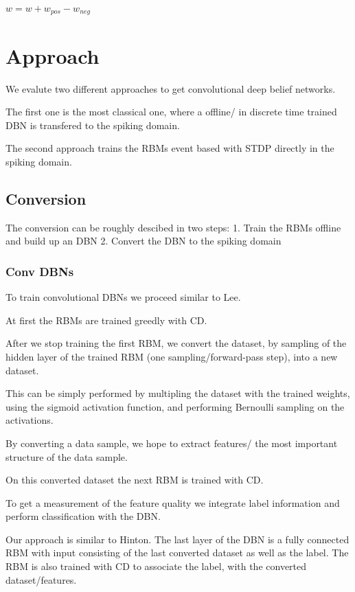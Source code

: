 $w = w + w_{pos} - w_{neg}$

\chapter{Approach}

We evalute two different approaches to get convolutional deep belief networks.

The first one is the most classical one, where a offline/ in discrete time trained DBN is transfered to the spiking domain.

The second approach trains the RBMs event based with STDP directly in the spiking domain. 

\section{Conversion}

The conversion can be roughly descibed in two steps:
1. Train the RBMs offline and build up an DBN
2. Convert the DBN to the spiking domain

\subsection{Conv DBNs}

To train convolutional DBNs we proceed similar to Lee.

At first the RBMs are trained greedly with CD.

After we stop training the first RBM, we convert the dataset, by sampling of the hidden layer of the trained RBM (one sampling/forward-pass step), into a new dataset.

This can be simply performed by multipling the dataset with the trained weights, using the sigmoid activation function, and performing Bernoulli sampling on the activations.

By converting a data sample, we hope to extract features/ the most important structure of the data sample.

On this converted dataset the next RBM is trained with CD.

To get a measurement of the feature quality we integrate label information and  perform classification with the DBN.

Our approach is similar to Hinton. 
The last layer of the DBN is a fully connected RBM with input consisting of the last converted dataset as well as the label.
The RBM is also trained with CD to associate the label, with the converted dataset/features.

